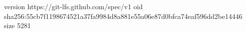version https://git-lfs.github.com/spec/v1
oid sha256:55cb7f1198674521a37fa9984d8a881e55a06e87d0bfca74eaf596dd2be14446
size 5281
